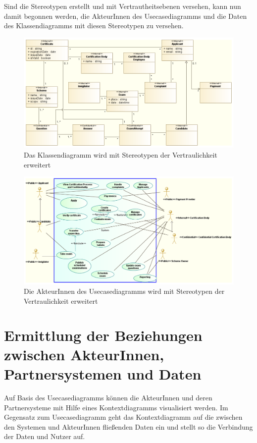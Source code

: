 Sind die Stereotypen erstellt und mit Vertrautheitsebenen versehen, kann nun damit begonnen werden, die AkteurInnen des Usecasediagramms und die Daten des Klassendiagramms mit diesen Stereotypen zu versehen.

\begin{figure}[H]
    \centering
    \includegraphics[scale=0.5]{uml/classstereotyped.png}
    \caption{Das Klassendiagramm wird mit Stereotypen der Vertraulichkeit erweitert}
\end{figure}

\begin{figure}[H]
    \centering
    \includegraphics[scale=0.4]{uml/stereotypedusecase.png}
    \caption{Die AkteurInnen des Usecasediagramms wird mit Stereotypen der Vertraulichkeit erweitert}
\end{figure}

\section{Ermittlung der Beziehungen zwischen AkteurInnen, Partnersystemen und Daten}
Auf Basis des Usecasediagramms können die AkteurInnen und deren Partnersysteme mit Hilfe eines Kontextdiagramms visualisiert werden. Im Gegensatz zum Usecasediagramm geht das Kontextdiagramm auf die zwischen den Systemen und AkteurInnen fließenden Daten ein und stellt so die Verbindung der Daten und Nutzer auf.

